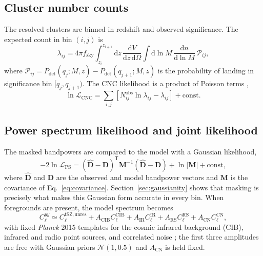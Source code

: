 \documentclass[aps,prd,twocolumn,superscriptaddress,nofootinbib,floatfix]{revtex4-2}
\newcommand{\dd}{\mathrm{d}}
\begin{document}
\subsection{Cluster number counts}
\label{sec:cnc}

The resolved clusters are binned in redshift and observed significance.
The expected count in bin $(i,j)$ is
\begin{equation}
    \lambda_{ij}
    = 4\pi f_{\mathrm{sky}}
    \int_{z_i}^{z_{i+1}} \dd z \,\frac{\dd V}{\dd z \,\dd \Omega}
    \int \dd \ln M \,\frac{\dd n}{\dd \ln M}\,
    \mathcal{P}_{ij},
    \label{eq:lambda}
\end{equation}
where $\mathcal{P}_{ij} = P_{\mathrm{det}}(q_j; M, z) - P_{\mathrm{det}}(q_{j+1}; M, z)$ is the probability of landing in significance bin $[q_j, q_{j+1})$.
The CNC likelihood is a product of Poisson terms \citep{Cash:1979,Zubeldia:2024lke},
\begin{equation}
    \ln \mathcal{L}_{\mathrm{CNC}}
    = \sum_{i,j}
    \left[
        N_{ij}^{\mathrm{obs}} \ln \lambda_{ij} - \lambda_{ij}
    \right] + \mathrm{const}.
    \label{eq:lnLCNC}
\end{equation}

\subsection{Power spectrum likelihood and joint likelihood}
\label{sec:joint}

The masked bandpowers are compared to the model with a Gaussian likelihood,
\begin{equation}
    -2 \ln \mathcal{L}_{\mathrm{PS}}
    = (\hat{\bm{D}} - \bm{D})^{\mathsf T}
    \bm{M}^{-1}
    (\hat{\bm{D}} - \bm{D})
    + \ln |\bm{M}| + \mathrm{const},
    \label{eq:lnLPS}
\end{equation}
where $\hat{\bm{D}}$ and $\bm{D}$ are the observed and model bandpower vectors and $\bm{M}$ is the covariance of Eq.~\eqref{eq:covariance}.
Section~\ref{sec:gaussianity} shows that masking is precisely what makes this Gaussian form accurate in every bin.
When foregrounds are present, the model spectrum becomes
\begin{equation}
    C_\ell^{yy} \simeq
    C_\ell^{\mathrm{tSZ,unres}}
    + A_{\mathrm{CIB}} C_\ell^{\mathrm{CIB}}
    + A_{\mathrm{IR}} C_\ell^{\mathrm{IR}}
    + A_{\mathrm{RS}} C_\ell^{\mathrm{RS}}
    + A_{\mathrm{CN}} C_\ell^{\mathrm{CN}},
    \label{eq:fg_model}
\end{equation}
with fixed \textit{Planck} 2015 templates for the cosmic infrared background (CIB), infrared and radio point sources, and correlated noise \citep{Planck:2015vgm}; the first three amplitudes are free with Gaussian priors $\mathcal{N}(1, 0.5)$ and $A_{\mathrm{CN}}$ is held fixed.
\end{document}
